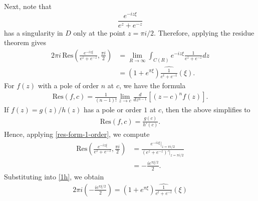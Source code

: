 \documentclass[12pt,reqno]{amsart}
\numberwithin{equation}{section}  %
\newcommand{\wh}{\widehat}
\begin{document}
        Next, note that $$\frac{e^{-i z \xi}}{e^{z} +
        e^{-z}}$$ has a singularity in $D$ only at the
        point $z = \pi i/2$. Therefore, applying the residue theorem gives
        \begin{equation}
          \label{1h}
        \begin{split}
          2 \pi i \, \text{Res}
          \left( \frac{ e^{-iz \xi}}{e^{z} + e^{-z}}, \frac{\pi i}{2}
          \right)
          & = \lim_{R \to \infty} \int_{C(R)} e^{-i z \xi}
          \frac{1}{e^{z} + e^{-z}} dz 
          \\
          & = (1 + e^{ \pi \xi})
          \wh{\frac{1}{e^{t} + e^{-t}}}(\xi).
        \end{split}
        \end{equation}
        For $f(z)$ with a pole of order $n$ at $c$, we have the formula
        \begin{equation}
          \label{res-form}
        \begin{split}
          \text{Res}(f, c) =  \frac{1}{(n-1)!} \lim_{z \to c}
          \frac{d}{dz^{n-1}} \left[ (z-c)^{n} f(z) \right].
        \end{split}
        \end{equation}
        If $f(z) = g(z)/h(z)$ has a pole or order $1$ at $c$, then the above
        simplifies to
        \begin{equation}
          \label{res-form-1-order}
        \begin{split}
          \text{Res}(f,c) = \frac{g(c)}{h'(c)}.
        \end{split}
        \end{equation}
        Hence, applying \eqref{res-form-1-order}, we compute
        \begin{equation*}
        \begin{split}
          \text{Res} \left( \frac{ e^{-iz \xi}}{e^{z} + e^{-z}},
          \frac{\pi i}{2} \right)
          & = \frac{e^{-iz \xi} \vert_{z = \pi i/2}}{(e^{z} + e^{-z})'
          \vert_{z = \pi i/2}}
          \\
          & = - \frac{i e^{ \pi \xi/2}}{2}.
        \end{split}
        \end{equation*}
        Substituting into \eqref{1h}, we obtain
        \begin{equation*}
        \begin{split}
          2 \pi i \left( - \frac{ie^{ \pi \xi/2}}{2} \right) =  (1 +
          e^{ \pi \xi}) \wh{\frac{1}{e^{t} + e^{-t}}}(\xi)
        \end{split}
        \end{equation*}
\end{document}
